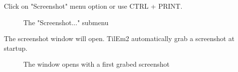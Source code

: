 \documentclass[10pt]{report}
\begin{document}
Click on "Screenshot" menu option or use CTRL + PRINT.\newline
\begin{figure}[H]
\centering
{}
\caption{The "Screenshot..." submenu}
\end{figure}

The screenshot window will open.\newline
TilEm2 automatically grab a screenshot at startup.\newline
\begin{figure}[H]
\centering
{}
\caption{The window opens with a first grabed screenshot}
\end{figure}
\end{document}

